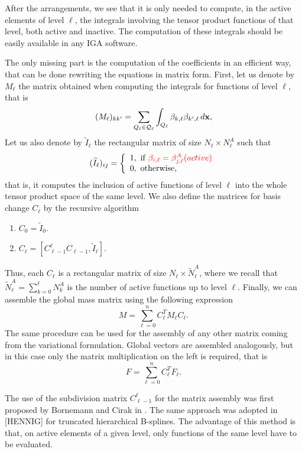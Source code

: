 \documentclass[a4paper]{siamltex1213}
\newcommand{\Rd}{\color{red}}
\newcommand\QQ{\mathcal Q}
\newcommand{\bx}{{\bf x}}
\let\tilde\widetilde
\begin{document}
After the arrangements, we see that it is only needed to compute, in the active elements of level $\ell$, the integrals involving the tensor product functions of that level, both active and inactive. The computation of these integrals should be easily available in any IGA software.

The only missing part is the computation of the coefficients in an efficient way, that can be done rewriting the equations in matrix form. First, let us denote by $M_\ell$ the matrix obtained when computing the integrals for functions of level $\ell$, that is
\begin{equation*}
(M_\ell)_{k k'} = \sum_{Q_\ell \in \QQ_\ell}  \int_{Q_\ell}  \beta_{k,\ell}  \beta_{k',\ell} \, d\bx,
\end{equation*}
Let us also denote by $\tilde I_\ell$ the rectangular matrix of size $N_\ell \times N^A_\ell$ such that
$$
(\tilde I_\ell)_{ij} = \left \{ 
\begin{array}{l}
1, \text{ if }  {\Rd \beta_{i,\ell} = \beta^A_{j,\ell} (active)} \\
0, \text{ otherwise, }
\end{array}
\right.
$$
that is, it computes the inclusion of active functions of level $\ell$ into the whole tensor product space of the same level. We also define the matrices for basis change $C_\ell$ by the recursive algorithm
\begin{enumerate}
\item $C_0 = \tilde I_0$.
\item $C_\ell = [C_{\ell-1}^\ell C_{\ell-1}, \tilde I_\ell]$.
\end{enumerate}
Thus, each $C_\ell$ is a rectangular matrix of size $N_\ell \times \tilde N^A_\ell$, where we recall that {\Rd $\tilde N^A_\ell = \sum_{k=0}^\ell N^A_k$} is the number of active functions up to level $\ell$. Finally, we can assemble the global mass matrix using the following expression
\begin{equation*}
M = \sum_{\ell = 0}^n C^T_\ell M_\ell C_\ell.
\end{equation*}
The same procedure can be used for the assembly of any other matrix coming from the variational formulation. Global vectors are assembled analogously, but in this case only the matrix multiplication on the left is required, that is
\begin{equation*}
F = \sum_{\ell = 0}^n C^T_\ell F_\ell.
\end{equation*}

The use of the subdivision matrix $C^\ell_{\ell-1}$ for the matrix assembly was first proposed by Bornemann and Cirak in \cite{Bornemann2013584}. The same approach was adopted in \cite{}[HENNIG] for truncated hierarchical B-splines. The advantage of this method is that, on active elements of a given level, only functions of the same level have to be evaluated.
\end{document}
